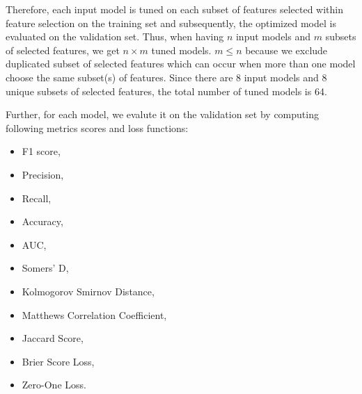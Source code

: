         \vspace{-1em}
        Therefore, each input model is tuned on each subset of features selected within feature selection on the training set and subsequently, the optimized model is evaluated on the validation set. Thus, when having $n$ input models and $m$ subsets of selected features, we get $n \times m$ tuned models.
        $m \leq n$ because we exclude duplicated subset of selected features which can occur when more than one model choose the same subset(s) of features.
        Since there are 8 input models and 8 unique subsets of selected features, the total number of tuned models is 64.
        
        Further, for each model, we evalute it on the validation set by computing following metrics scores and loss functions:
        \begin{itemize}\setlength\itemsep{0em}
            \item F1 score,
            \item Precision,
            \item Recall,
            \item Accuracy,
            \item AUC,
            \item Somers' D,
            \item Kolmogorov Smirnov Distance,
            \item Matthews Correlation Coefficient,
            \item Jaccard Score,
            \item Brier Score Loss,
            \item Zero-One Loss.
        \end{itemize}
        
